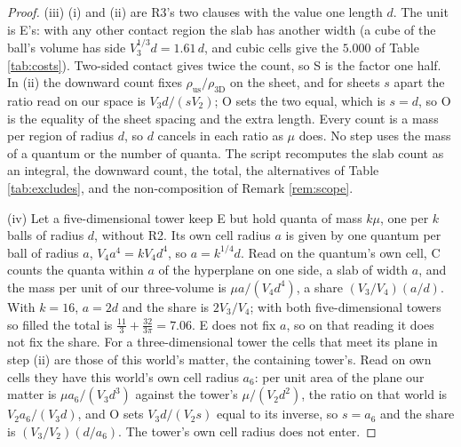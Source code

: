 \documentclass[11pt]{article}
\theoremstyle{definition}
\begin{document}
\begin{proof}
(iii) (i) and (ii) are R3's two clauses with the value one length $d$. The unit is E's: with any other contact region the slab has another width (a cube of the ball's volume has side $V_{3}^{1/3}d = 1.61\,d$, and cubic cells give the $5.000$ of Table \ref{tab:costs}). Two-sided contact gives twice the count, so S is the factor one half. In (ii) the downward count fixes $\rho_{\mathrm{us}}/\rho_{3\mathrm{D}}$ on the sheet, and for sheets $s$ apart the ratio read on our space is $V_{3}d/(sV_{2})$; O sets the two equal, which is $s = d$, so O is the equality of the sheet spacing and the extra length. Every count is a mass per region of radius $d$, so $d$ cancels in each ratio as $\mu$ does. No step uses the mass of a quantum or the number of quanta. The script recomputes the slab count as an integral, the downward count, the total, the alternatives of Table \ref{tab:excludes}, and the non-composition of Remark \ref{rem:scope}.

(iv) Let a five-dimensional tower keep E but hold quanta of mass $k\mu$, one per $k$ balls of radius $d$, without R2. Its own cell radius $a$ is given by one quantum per ball of radius $a$, $V_{4}a^{4} = kV_{4}d^{4}$, so $a = k^{1/4}d$. Read on the quantum's own cell, C counts the quanta within $a$ of the hyperplane on one side, a slab of width $a$, and the mass per unit of our three-volume is $\mu a/(V_{4}d^{4})$, a share $(V_{3}/V_{4})(a/d)$. With $k = 16$, $a = 2d$ and the share is $2V_{3}/V_{4}$; with both five-dimensional towers so filled the total is $\tfrac{11}{3} + \tfrac{32}{3\pi} = 7.06$. E does not fix $a$, so on that reading it does not fix the share. For a three-dimensional tower the cells that meet its plane in step (ii) are those of this world's matter, the containing tower's. Read on own cells they have this world's own cell radius $a_{6}$: per unit area of the plane our matter is $\mu a_{6}/(V_{3}d^{3})$ against the tower's $\mu/(V_{2}d^{2})$, the ratio on that world is $V_{2}a_{6}/(V_{3}d)$, and O sets $V_{3}d/(V_{2}s)$ equal to its inverse, so $s = a_{6}$ and the share is $(V_{3}/V_{2})(d/a_{6})$. The tower's own cell radius does not enter.
\end{proof}
\end{document}
